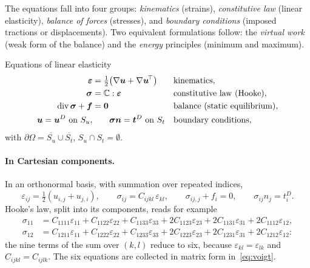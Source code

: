 The equations fall into four groups: \emph{kinematics} (strains),
\emph{constitutive law} (linear elasticity), \emph{balance of forces}
(stresses), and \emph{boundary conditions} (imposed tractions or
displacements). Two equivalent formulations follow: the \emph{virtual work}
(weak form of the balance) and the \emph{energy} principles (minimum and
maximum).

\begin{gbox}{Equations of linear elasticity}
\begin{align}
  \bm{\varepsilon}&=\tfrac12\bigl(\nabla\bm{u}+\nabla\bm{u}^{\!\top}\bigr)
  &&\text{kinematics}, \label{eq:kine}\\
  \bm{\sigma}&=\mathbb{C}:\bm{\varepsilon} &&\text{constitutive law (Hooke)}, \label{eq:hooke}\\
  \operatorname{div}\bm{\sigma}+\bm{f}&=\bm{0} &&\text{balance (static equilibrium)}, \label{eq:balance}\\
  \bm{u}=\bm{u}^{D}\ \text{on }S_u, &\qquad \bm{\sigma}\bm{n}=\bm{t}^{D}\ \text{on }S_t
  &&\text{boundary conditions}, \label{eq:bc}
\end{align}
with $\partial\Omega=\overline{S_u}\cup\overline{S_t}$, $S_u\cap S_t=\emptyset$.
\end{gbox}

\paragraph{In Cartesian components.}
%
In an orthonormal basis, with summation over repeated indices,
\[
  \varepsilon_{ij}=\tfrac12(u_{i,j}+u_{j,i}),\qquad
  \sigma_{ij}=C_{ijkl}\,\varepsilon_{kl},\qquad
  \sigma_{ij,j}+f_i=0,\qquad \sigma_{ij}n_j=t^D_i .
\]
Hooke's law, split into its components, reads for example
\begin{align*}
  \sigma_{11}&=C_{1111}\varepsilon_{11}+C_{1122}\varepsilon_{22}+C_{1133}\varepsilon_{33}
  +2C_{1123}\varepsilon_{23}+2C_{1131}\varepsilon_{31}+2C_{1112}\varepsilon_{12},\\
  \sigma_{12}&=C_{1211}\varepsilon_{11}+C_{1222}\varepsilon_{22}+C_{1233}\varepsilon_{33}
  +2C_{1223}\varepsilon_{23}+2C_{1231}\varepsilon_{31}+2C_{1212}\varepsilon_{12}:
\end{align*}
the nine terms of the sum over $(k,l)$ reduce to six, because
$\varepsilon_{kl}=\varepsilon_{lk}$ and $C_{ijkl}=C_{ijlk}$. The six
equations are collected in matrix form in~\eqref{eq:voigt}.

